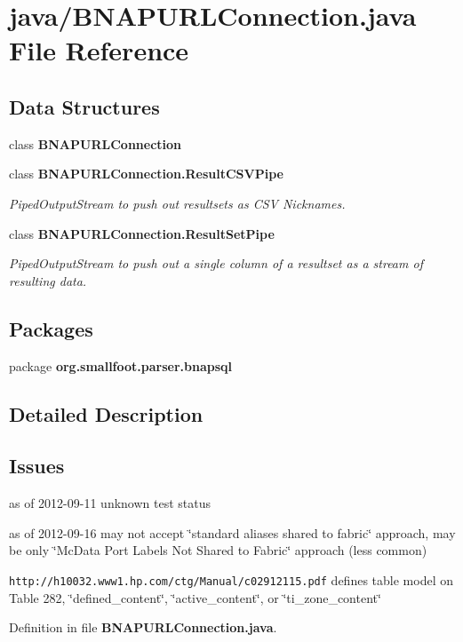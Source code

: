 \section{java/\+B\+N\+A\+P\+U\+R\+L\+Connection.java File Reference}
\label{BNAPURLConnection_8java}
\subsection*{Data Structures}
\begin{DoxyCompactItemize}
\item 
class {\bf B\+N\+A\+P\+U\+R\+L\+Connection}
\item 
class {\bfseries B\+N\+A\+P\+U\+R\+L\+Connection.\+Result\+C\+S\+V\+Pipe}
\begin{DoxyCompactList}\small\item\em Piped\+Output\+Stream to push out resultsets as C\+S\+V Nicknames. \end{DoxyCompactList}\item 
class {\bfseries B\+N\+A\+P\+U\+R\+L\+Connection.\+Result\+Set\+Pipe}
\begin{DoxyCompactList}\small\item\em Piped\+Output\+Stream to push out a single column of a resultset as a stream of resulting data. \end{DoxyCompactList}\end{DoxyCompactItemize}
\subsection*{Packages}
\begin{DoxyCompactItemize}
\item 
package {\bf org.\+smallfoot.\+parser.\+bnapsql}
\end{DoxyCompactItemize}


\subsection{Detailed Description}
\subsection{Issues}\label{BNAPURLConnection_8java_Known}

\begin{DoxyItemize}
\item as of 2012-\/09-\/11 unknown test status
\item as of 2012-\/09-\/16 may not accept \char`\"{}standard aliases shared to fabric\char`\"{} approach, may be only \char`\"{}\+Mc\+Data Port Labels Not Shared to Fabric\char`\"{} approach (less common)
\begin{DoxyItemize}
\item {\tt http\+://h10032.\+www1.\+hp.\+com/ctg/\+Manual/c02912115.\+pdf} defines table model on Table 282, \char`\"{}defined\+\_\+content\char`\"{}, \char`\"{}active\+\_\+content\char`\"{}, or \char`\"{}ti\+\_\+zone\+\_\+content\char`\"{} 
\end{DoxyItemize}
\end{DoxyItemize}

Definition in file {\bf B\+N\+A\+P\+U\+R\+L\+Connection.\+java}.

